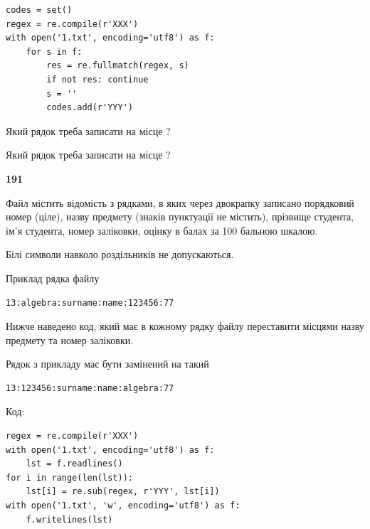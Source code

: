 \begin{verbatim}
codes = set()
regex = re.compile(r'XXX')
with open('1.txt', encoding='utf8') as f:
    for s in f:
        res = re.fullmatch(regex, s)
        if not res: continue
        s = ''
        codes.add(r'YYY')
\end{verbatim}





Який рядок треба записати на місце  ?\par
\vspace{5mm}


Який рядок треба записати на місце  ?\par


\newpage

{\begin {center}\textbf{ 191}\end {center}}\par
Файл  містить відомість з рядками, в яких через двокрапку записано поряд\-ковий номер (ціле), назву предмету (знаків пунктуації не містить), прізвище студента, ім'я студента, номер заліковки, оцінку в балах за 100 бальною шкалою.

Білі символи навколо роздільників не допускаються.

Приклад рядка файлу



\begin{verbatim}
13:algebra:surname:name:123456:77
\end{verbatim}


Нижче наведено код, який має в кожному рядку файлу переставити місцями назву предмету та номер заліковки.

Рядок з прикладу має бути замінений на такий



\begin{verbatim}
13:123456:surname:name:algebra:77
\end{verbatim}




Код:



\begin{verbatim}
regex = re.compile(r'XXX')
with open('1.txt', encoding='utf8') as f:
    lst = f.readlines()
for i in range(len(lst)):
    lst[i] = re.sub(regex, r'YYY', lst[i])
with open('1.txt', 'w', encoding='utf8') as f:
    f.writelines(lst)
\end{verbatim}








